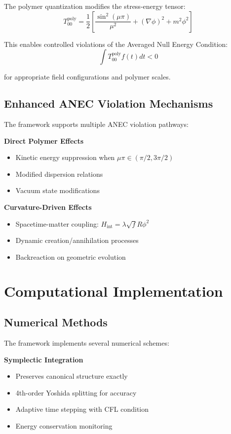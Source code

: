 \documentclass[11pt]{article}
\begin{document}
The polymer quantization modifies the stress-energy tensor:
\begin{equation}
T_{00}^{\text{poly}} = \frac{1}{2}\left[\frac{\sin^2(\mu\pi)}{\mu^2} + (\nabla\phi)^2 + m^2\phi^2\right]
\end{equation}

This enables controlled violations of the Averaged Null Energy Condition:
\begin{equation}
\int T_{00}^{\text{poly}} f(t) dt < 0
\end{equation}

for appropriate field configurations and polymer scales.

\subsection{Enhanced ANEC Violation Mechanisms}

The framework supports multiple ANEC violation pathways:

\textbf{Direct Polymer Effects}
\begin{itemize}
\item Kinetic energy suppression when $\mu\pi \in (\pi/2, 3\pi/2)$
\item Modified dispersion relations
\item Vacuum state modifications
\end{itemize}

\textbf{Curvature-Driven Effects}
\begin{itemize}
\item Spacetime-matter coupling: $H_{\text{int}} = \lambda\sqrt{f}R\phi^2$
\item Dynamic creation/annihilation processes
\item Backreaction on geometric evolution
\end{itemize}

\section{Computational Implementation}

\subsection{Numerical Methods}

The framework implements several numerical schemes:

\textbf{Symplectic Integration}
\begin{itemize}
\item Preserves canonical structure exactly
\item 4th-order Yoshida splitting for accuracy
\item Adaptive time stepping with CFL condition
\item Energy conservation monitoring
\end{itemize}
\end{document}
